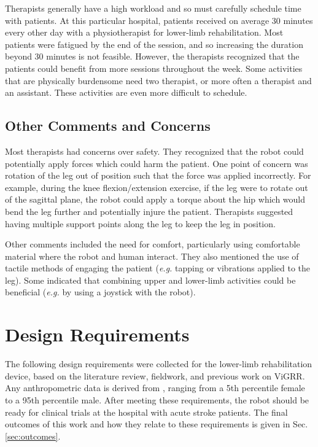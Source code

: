 \documentclass[12pt]{report}
\begin{document}
	Therapists generally have a high workload and so must carefully schedule time with patients. At this particular hospital, patients received on average 30 minutes every other day with a physiotherapist for lower-limb rehabilitation. Most patients were fatigued by the end of the session, and so increasing the duration beyond 30 minutes is not feasible. However, the therapists recognized that the patients could benefit from more sessions throughout the week. Some activities that are physically burdensome need two therapist, or more often a therapist and an assistant. These activities are even more difficult to schedule.
	
	\subsection{Other Comments and Concerns}
	
	Most therapists had concerns over safety. They recognized that the robot could potentially apply forces which could harm the patient. One point of concern was rotation of the leg out of position such that the force was applied incorrectly. For example, during the knee flexion/extension exercise, if the leg were to rotate out of the sagittal plane, the robot could apply a torque about the hip which would bend the leg further and potentially injure the patient. Therapists suggested having multiple support points along the leg to keep the leg in position. 
	
	Other comments included the need for comfort, particularly using comfortable material where the robot and human interact. They also mentioned the use of tactile methods of engaging the patient (\textit{e.g.} tapping or vibrations applied to the leg). Some indicated that combining upper and lower-limb activities could be beneficial (\textit{e.g.} by using a joystick with the robot). 
	
\section{Design Requirements} \label{sec:requirements} 

The following design requirements were collected for the lower-limb rehabilitation device, based on the literature review, fieldwork, and previous work on ViGRR. Any anthropometric data is derived from \cite{Winter2009}, ranging from a 5th percentile female to a 95th percentile male. After meeting these requirements, the robot should be ready for clinical trials at the hospital with acute stroke patients. The final outcomes of this work and how they relate to these requirements is given in Sec.\ref{sec:outcomes}.
\end{document}

